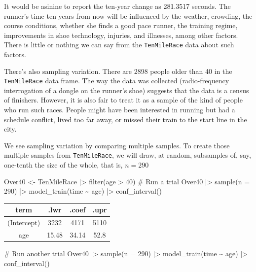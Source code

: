 \documentclass[
  letterpaper,
  DIV=11,
  numbers=noendperiod,
  oneside]{scrartcl}
\newenvironment{Shaded}{\begin{snugshade}}{\end{snugshade}}
\newcommand{\AttributeTok}[1]{\textcolor[rgb]{0.40,0.45,0.13}{#1}}
\newcommand{\CommentTok}[1]{\textcolor[rgb]{0.37,0.37,0.37}{#1}}
\newcommand{\DecValTok}[1]{\textcolor[rgb]{0.68,0.00,0.00}{#1}}
\newcommand{\FunctionTok}[1]{\textcolor[rgb]{0.28,0.35,0.67}{#1}}
\newcommand{\NormalTok}[1]{\textcolor[rgb]{0.00,0.23,0.31}{#1}}
\newcommand{\OtherTok}[1]{\textcolor[rgb]{0.00,0.23,0.31}{#1}}
\newcommand{\SpecialCharTok}[1]{\textcolor[rgb]{0.37,0.37,0.37}{#1}}
\begin{document}
It would be asinine to report the ten-year change as 281.3517 seconds.
The runner's time ten years from now will be influenced by the weather,
crowding, the course conditions, whether she finds a good pace runner,
the training regime, improvements in shoe technology, injuries, and
illnesses, among other factors. There is little or nothing we can say
from the \texttt{TenMileRace} data about such factors.

There's also sampling variation. There are 2898 people older than 40 in
the \texttt{TenMileRace} data frame. The way the data was collected
(radio-frequency interrogation of a dongle on the runner's shoe)
suggests that the data is a census of finishers. However, it is also
fair to treat it as a sample of the kind of people who run such races.
People might have been interested in running but had a schedule
conflict, lived too far away, or missed their train to the start line in
the city.

We see sampling variation by comparing multiple samples. To create those
multiple samples from \texttt{TenMileRace}, we will draw, at random,
subsamples of, say, one-tenth the size of the whole, that is, \(n=290\)

\begin{Shaded}
\begin{Highlighting}[]
\NormalTok{Over40 }\OtherTok{\textless{}{-}}\NormalTok{ TenMileRace }\SpecialCharTok{|\textgreater{}} \FunctionTok{filter}\NormalTok{(age }\SpecialCharTok{\textgreater{}} \DecValTok{40}\NormalTok{)}
\CommentTok{\# Run a trial}
\NormalTok{Over40 }\SpecialCharTok{|\textgreater{}} \FunctionTok{sample}\NormalTok{(}\AttributeTok{n =} \DecValTok{290}\NormalTok{) }\SpecialCharTok{|\textgreater{}}
  \FunctionTok{model\_train}\NormalTok{(time }\SpecialCharTok{\textasciitilde{}}\NormalTok{ age) }\SpecialCharTok{|\textgreater{}}
  \FunctionTok{conf\_interval}\NormalTok{()}
\end{Highlighting}
\end{Shaded}

\begin{longtable}[]{@{}cccc@{}}
\toprule\noalign{}
term & .lwr & .coef & .upr \\
\midrule\noalign{}
\endhead
\bottomrule\noalign{}
\endlastfoot
(Intercept) & 3232 & 4171 & 5110 \\
age & 15.48 & 34.14 & 52.8 \\
\end{longtable}

\begin{Shaded}
\begin{Highlighting}[]
\CommentTok{\# Run another trial}
\NormalTok{Over40 }\SpecialCharTok{|\textgreater{}} \FunctionTok{sample}\NormalTok{(}\AttributeTok{n =} \DecValTok{290}\NormalTok{) }\SpecialCharTok{|\textgreater{}}
  \FunctionTok{model\_train}\NormalTok{(time }\SpecialCharTok{\textasciitilde{}}\NormalTok{ age) }\SpecialCharTok{|\textgreater{}}
  \FunctionTok{conf\_interval}\NormalTok{()}
\end{Highlighting}
\end{Shaded}
\end{document}
